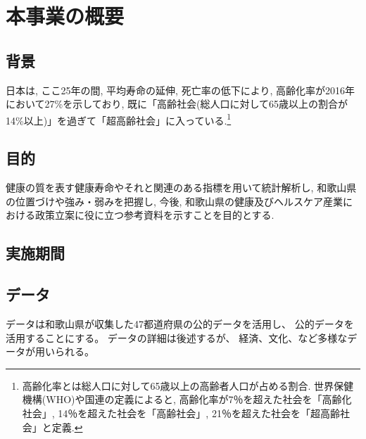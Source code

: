 



\chapter{本事業の概要}
\section{背景}
日本は, ここ25年の間, 平均寿命の延伸, 死亡率の低下により, 高齢化率が2016年において27\%を示しており, 既に「高齢社会(総人口に対して65歳以上の割合が14\%以上)」を過ぎて「超高齢社会」に入っている.\footnote{
	高齢化率とは総人口に対して65歳以上の高齢者人口が占める割合. 世界保健機構(WHO)や国連の定義によると, 高齢化率が7％を超えた社会を「高齢化社会」, 14％を超えた社会を「高齢社会」, 21％を超えた社会を「超高齢社会」と定義.
}

\section{目的}
健康の質を表す健康寿命やそれと関連のある指標を用いて統計解析し, 和歌山県の位置づけや強み・弱みを把握し, 今後, 和歌山県の健康及びヘルスケア産業における政策立案に役に立つ参考資料を示すことを目的とする.

\section{実施期間}


\section{データ}
データは和歌山県が収集した47都道府県の公的データを活用し、
公的データを活用することにする。
データの詳細は後述するが、
経済、文化、など多様なデータが用いられる。



